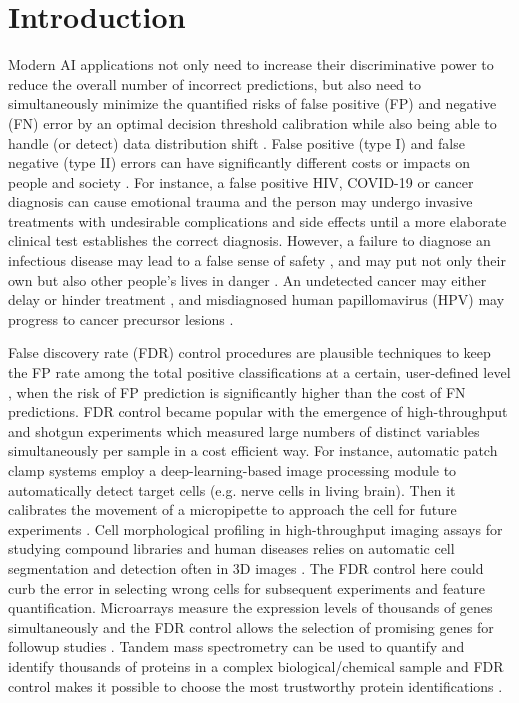 \documentclass[10pt,letterpaper]{article}
\begin{document}
\linenumbers

\section*{Introduction}
Modern AI applications not only need to increase their discriminative power to reduce the overall number of incorrect predictions, but also need to simultaneously minimize the quantified risks of false positive (FP) and negative (FN) error by an optimal decision threshold calibration while also being able to handle (or detect) data distribution shift \cite{feng2022clinical, al2023artificial}.
False positive (type I) and false negative (type II) errors can have significantly different costs or impacts on people and society \cite{wynants2019three}.
For instance, a false positive HIV, COVID-19 or cancer diagnosis can cause emotional trauma and the person may undergo invasive treatments with undesirable complications and side effects \cite{newman2021rate, salz2010meta, Tosteson2014Consequences, xu2016frequency} until a more elaborate clinical test establishes the correct diagnosis.
However, a failure to diagnose an infectious disease may lead to a false sense of safety \cite{mouliou2021false}, and may put not only their own but also other people's lives in danger \cite{woloshin2020false}.
An undetected cancer may either delay or hinder treatment \cite{bradley2021interpreting}, and misdiagnosed human papillomavirus (HPV) may progress to cancer precursor lesions \cite{macios2022false,pinsky2015principles}. 


False discovery rate (FDR) control procedures are plausible techniques to keep the FP rate among the total positive classifications at a certain, user-defined level \cite{Benjamini1995Controlling}, when the risk of FP prediction is significantly higher than the cost of FN predictions.
FDR control became popular with the emergence of high-throughput and shotgun experiments which measured large numbers of distinct variables simultaneously per sample in a cost efficient way.
For instance, automatic patch clamp systems employ a deep-learning-based image processing module to automatically detect target cells (e.g. nerve cells in living brain).
Then it calibrates the movement of a micropipette to approach the cell for future experiments \cite{koos2021automatic}.
Cell morphological profiling in high-throughput imaging assays for studying compound libraries and human diseases \cite{moshkov2024learning} relies on automatic cell segmentation and detection often in 3D images \cite{falk2019u}.
The FDR control here could curb the error in selecting wrong cells for subsequent experiments and feature quantification.
Microarrays measure the expression levels of thousands of genes simultaneously and the FDR control allows the selection of promising genes for followup studies \cite{storey2002direct,storey2003statistical,barber2015controlling}.
Tandem mass spectrometry can be used to quantify and identify thousands of proteins in a complex biological/chemical sample and FDR control makes it possible to choose the most trustworthy protein identifications \cite{elias2007target}.
\end{document}
